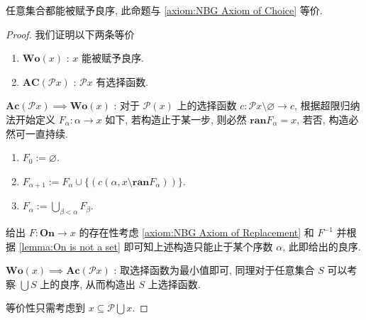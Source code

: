 \begin{theorem}
     \label{theorem:well-ordering theorem} 
    任意集合都能被赋予良序, 此命题与 \ref{axiom:NBG Axiom of Choice} 等价.

    \begin{proof}
        我们证明以下两条等价
        \begin{enumerate}
            \item \(\mathbf{Wo} (x)\) : \(x\) 能被赋予良序.
            \item \(\mathbf{AC} (\mathcal{P} x)\) : \(\mathcal{P} x\) 有选择函数.
        \end{enumerate}

        \(\mathbf{Ac} (\mathcal{P}x) \implies \mathbf{Wo} (x)\) : 对于 \(\mathcal{P} (x)\) 上的选择函数 \(c : \mathcal{P}x \setminus {\varnothing} \to c\),
        根据超限归纳法开始定义 \(F_\alpha : \alpha \to x\) 如下, 若构造止于某一步, 则必然 \(\mathbf{ran} F_\alpha = x\), 若否, 构造必然可一直持续.

        \begin{enumerate}
            \item \(F_0 := \varnothing\).
            \item \(F_{\alpha + 1} := F_\alpha \cup \{(c (\alpha,x \setminus \mathbf{ran} F_\alpha))\}\).
            \item \(F_\alpha := \bigcup_{\beta < \alpha} F_\beta\).
        \end{enumerate}

        给出 \(F : \mathbf{On} \to x\) 的存在性考虑 \ref{axiom:NBG Axiom of Replacement} 和 \(F^{-1}\) 并根据 \ref{lemma:On is not a set} 即可知上述构造只能止于某个序数 \(\alpha\), 此即给出的良序.

        \(\mathbf{Wo} (x) \implies \mathbf{Ac} (\mathcal{P}x)\) : 取选择函数为最小值即可, 同理对于任意集合 \(S\) 可以考察 \(\bigcup S\) 上的良序, 从而构造出 \(S\) 上选择函数.

        等价性只需考虑到 \(x \subseteq \mathcal{P} \bigcup x\).
    \end{proof}
\end{theorem}


